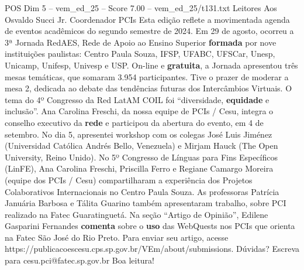 \begin{textsample}{POS Dim 5 – vem\_ed\_25 – Score 7.00 – vem\_ed\_25/t131.txt}  \label{ex:f5_pos_020}
Leitores Aos Osvaldo Succi Jr.
Coordenador PCIs Esta edição reflete a movimentada agenda de eventos acadêmicos do segundo semestre de 2024.
Em 29 de agosto, ocorreu a 3ª Jornada RedAES, Rede de Apoio ao Ensino Superior \textbf{formada} por nove instituições paulistas: Centro Paula Souza, IFSP, UFABC, UFSCar, Unesp, Unicamp, Unifesp, Univesp e USP.
On-line e \textbf{gratuita}, a Jornada apresentou três mesas temáticas, que somaram 3.954 participantes.
Tive o prazer de moderar a mesa 2, dedicada ao debate das tendências futuras dos Intercâmbios Virtuais.
O tema do 4º Congresso da Red LatAM COIL foi “diversidade, \textbf{equidade} e inclusão”.
Ana Carolina Freschi, da nossa equipe de PCIs / Cesu, integra o conselho executivo da \textbf{rede} e participou da abertura do evento, em 4 de setembro.
No dia 5, apresentei workshop com os colegas José Luis Jiménez (Universidad Católica Andrés Bello, Venezuela) e Mirjam Hauck (The Open University, Reino Unido).
No 5º Congresso de Línguas para Fins Específicos (LinFE), Ana Carolina Freschi, Priscilla Ferro e Regiane Camargo Moreira (equipe dos PCIs / Cesu) compartilharam a experiência dos Projetos Colaborativos Internacionais no Centro Paula Souza.
As professoras Patrícia Januária Barbosa e Tálita Guarino também apresentaram trabalho, sobre PCI realizado na Fatec Guaratinguetá.
Na seção “Artigo de Opinião”, Edilene Gasparini Fernandes \textbf{comenta} sobre o \textbf{uso} das WebQuests nos PCIs que orienta na Fatec São José do Rio Preto.
Para enviar seu artigo, acesse https://publicacoescesu.cps.sp.gov.br/VEm/about/submissions.
Dúvidas?
Escreva para cesu.pci@fatec.sp.gov.br Boa leitura!

\end{textsample}
